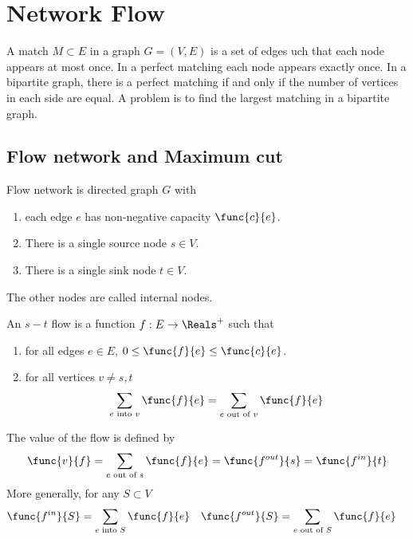 \chapter{Network Flow}
A match \(M \subset E\) in a graph \(G = (V,E)\) is a set of edges uch that each node appears at most once. In a perfect matching each node appears exactly once. In a bipartite graph, there is a perfect matching if and only if the number of vertices in each side are equal. A problem is to find the largest matching in a bipartite graph.
\section{Flow network and Maximum cut}
\begin{definition}
    Flow network is directed graph \(G\) with 
\begin{enumerate}
    \item each edge \(e\) has non-negative capacity \(\func{c}{e}\).
    \item There is a single source node \(s \in V\).
    \item There is a single sink node \(t \in V\).
\end{enumerate}
The other nodes are called internal nodes.
\end{definition}
\begin{definition}
    An \(s-t\) flow is a function \(f : E \to \Reals^+\) such that 
    \begin{enumerate}
        \item for all edges \(e \in E\), \(0 \leq \func{f}{e} \leq \func{c}{e}\).
        \item for all vertices \(v \neq s,t\)
        \begin{equation*}
            \sum_{e \text{ into } v} \func{f}{e} = \sum_{e \text{ out of } v} \func{f}{e}
        \end{equation*}
    \end{enumerate}
    The value of the flow is defined by 
    \begin{equation*}
        \func{v}{f} = \sum_{e  \text{ out of } s} \func{f}{e} = \func{f^{out}}{s} = \func{f^{in}}{t}
    \end{equation*}
    More generally, for any \(S \subset V\)
    \begin{align*}
        \func{f^{in}}{S} &= \sum_{e \text{ into } S} \func{f}{e} & \func{f^{out}}{S} &=  \sum_{e \text{ out of } S} \func{f}{e}
    \end{align*}
\end{definition}
